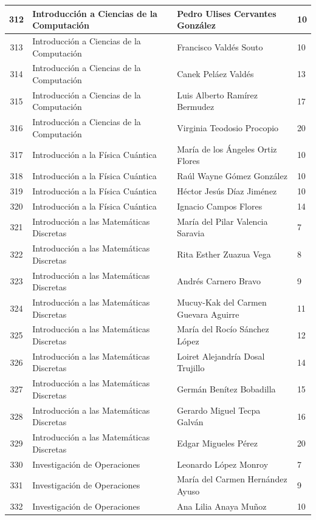 {\begin{longtable}{|c|p{6.5cm}|p{5cm}|p{1.5cm}|}
312 & Introducción a Ciencias de la Computación & Pedro Ulises Cervantes González & 10 \\ \hline
313 & Introducción a Ciencias de la Computación & Francisco Valdés Souto & 10 \\ \hline
314 & Introducción a Ciencias de la Computación & Canek Peláez Valdés & 13 \\ \hline
315 & Introducción a Ciencias de la Computación & Luis Alberto Ramírez Bermudez & 17 \\ \hline
316 & Introducción a Ciencias de la Computación & Virginia Teodosio Procopio & 20 \\ \hline
317 & Introducción a la Física Cuántica & María de los Ángeles Ortiz Flores & 10 \\ \hline
318 & Introducción a la Física Cuántica & Raúl Wayne Gómez González & 10 \\ \hline
319 & Introducción a la Física Cuántica & Héctor Jesús Díaz Jiménez & 10 \\ \hline
320 & Introducción a la Física Cuántica & Ignacio Campos Flores & 14 \\ \hline
321 & Introducción a las Matemáticas Discretas & María del Pilar Valencia Saravia & 7 \\ \hline
322 & Introducción a las Matemáticas Discretas & Rita Esther Zuazua Vega & 8 \\ \hline
323 & Introducción a las Matemáticas Discretas & Andrés Carnero Bravo & 9 \\ \hline
324 & Introducción a las Matemáticas Discretas & Mucuy-Kak del Carmen Guevara Aguirre & 11 \\ \hline
325 & Introducción a las Matemáticas Discretas & María del Rocío Sánchez López & 12 \\ \hline
326 & Introducción a las Matemáticas Discretas & Loiret Alejandría Dosal Trujillo & 14 \\ \hline
327 & Introducción a las Matemáticas Discretas & Germán Benítez Bobadilla & 15 \\ \hline
328 & Introducción a las Matemáticas Discretas & Gerardo Miguel Tecpa Galván & 16 \\ \hline
329 & Introducción a las Matemáticas Discretas & Edgar Migueles Pérez & 20 \\ \hline
330 & Investigación de Operaciones & Leonardo López Monroy & 7 \\ \hline
331 & Investigación de Operaciones & María del Carmen Hernández Ayuso & 9 \\ \hline
332 & Investigación de Operaciones & Ana Lilia Anaya Muñoz & 10 \\ \hline

\end{longtable}}
